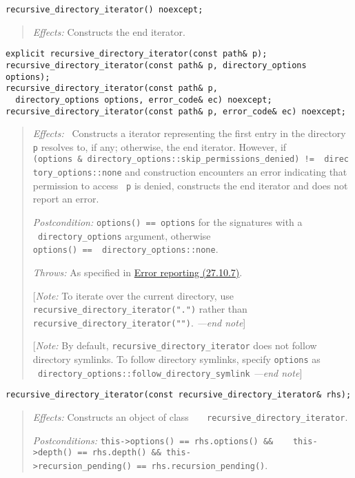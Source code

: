 \begin{verbatim}
recursive_directory_iterator() noexcept;
\end{verbatim}

\begin{quote}
\emph{Effects:} Constructs the end iterator.
\end{quote}

\begin{verbatim}
explicit recursive_directory_iterator(const path& p);
recursive_directory_iterator(const path& p, directory_options options);
recursive_directory_iterator(const path& p,
  directory_options options, error_code& ec) noexcept;
recursive_directory_iterator(const path& p, error_code& ec) noexcept;
\end{verbatim}

\begin{quote}
\emph{Effects:}~ Constructs a iterator representing the first entry in
the directory \texttt{p} resolves to, if any; otherwise, the end
iterator. However, if
\texttt{(options\ \&\ directory\_options::skip\_permissions\_denied)\ !=\ \ directory\_options::none}
and construction encounters an error indicating that permission to
access~ \texttt{p} is denied, constructs the end iterator and does not
report an error.

\emph{Postcondition:} \texttt{options()\ ==\ options} for the signatures
with a \texttt{\ directory\_options} argument, otherwise
\texttt{options()\ ==\ \ directory\_options::none}.

\emph{Throws:} As specified in \hyperref[Error-reporting]{Error
reporting (27.10.7)}.

{[}\emph{Note:} To iterate over the current directory, use
\texttt{recursive\_directory\_iterator(".")} rather than
\texttt{recursive\_directory\_iterator("")}. \emph{---end note}{]}

{[}\emph{Note:} By default, \texttt{recursive\_directory\_iterator} does
not follow directory symlinks. To follow directory symlinks, specify
\texttt{options} as
\texttt{\ directory\_options::follow\_directory\_symlink} \emph{---end
note}{]}
\end{quote}

\begin{verbatim}
recursive_directory_iterator(const recursive_directory_iterator& rhs);
\end{verbatim}

\begin{quote}
\emph{Effects:} Constructs an object of class
\texttt{\ \ \ recursive\_directory\_iterator}.

\emph{Postconditions:}
\texttt{this-\textgreater{}options()\ ==\ rhs.options()\ \&\&\ \ \ \ this-\textgreater{}depth()\ ==\ rhs.depth()\ \&\&\ this-\textgreater{}recursion\_pending()\ ==\ rhs.recursion\_pending()}.
\end{quote}

